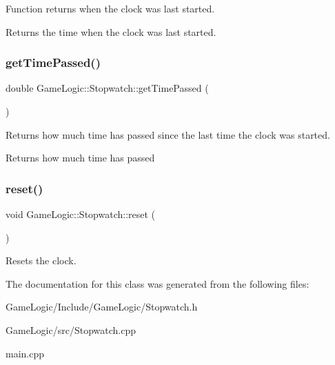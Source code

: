 Function returns when the clock was last started. \begin{DoxyReturn}{Returns}
the time when the clock was last started. 
\end{DoxyReturn}
\mbox{\label{classGameLogic_1_1Stopwatch_a71ca51fb998fd7c16a64bf6f13ce8faa}} 
\subsubsection{\texorpdfstring{get\+Time\+Passed()}{getTimePassed()}}
{\footnotesize\ttfamily double Game\+Logic\+::\+Stopwatch\+::get\+Time\+Passed (\begin{DoxyParamCaption}{ }\end{DoxyParamCaption})}

Returns how much time has passed since the last time the clock was started. \begin{DoxyReturn}{Returns}
how much time has passed 
\end{DoxyReturn}
\mbox{\label{classGameLogic_1_1Stopwatch_a8490b96964e128c93be7133e7a5386a5}} 
\subsubsection{\texorpdfstring{reset()}{reset()}}
{\footnotesize\ttfamily void Game\+Logic\+::\+Stopwatch\+::reset (\begin{DoxyParamCaption}{ }\end{DoxyParamCaption})}

Resets the clock. 

The documentation for this class was generated from the following files\+:\begin{DoxyCompactItemize}
\item 
Game\+Logic/\+Include/\+Game\+Logic/Stopwatch.\+h\item 
Game\+Logic/src/Stopwatch.\+cpp\item 
main.\+cpp\end{DoxyCompactItemize}
